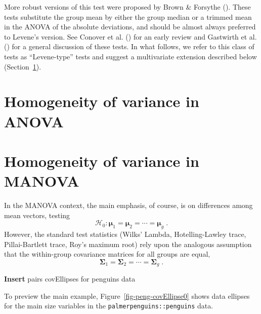 \documentclass[
  letterpaper,
  10pt,
  krantz2]{krantz}
\begin{document}
More robust versions of this test were proposed by Brown \& Forsythe
(). These tests substitute the
group mean by either the group median or a trimmed mean in the ANOVA of
the absolute deviations, and should be almost always preferred to
Levene's version. See Conover et al.
() for an early review and
Gastwirth et al. () for a
general discussion of these tests. In what follows, we refer to this
class of tests as ``Levene-type'' tests and suggest a multivariate
extension described below (Section~\ref{sec-mlevene}).

\section{Homogeneity of variance in ANOVA}\label{sec-mlevene}

\section{Homogeneity of variance in
MANOVA}\label{sec-homogeneity-MANOVA}

In the MANOVA context, the main emphasis, of course, is on differences
among mean vectors, testing \[
\mathcal{H}_0 : \mathbf{\mu}_1 = \mathbf{\mu}_2 = \cdots = \mathbf{\mu}_g \; .
\] However, the standard test statistics (Wilks' Lambda,
Hotelling-Lawley trace, Pillai-Bartlett trace, Roy's maximum root) rely
upon the analogous assumption that the within-group covariance matrices
for all groups are equal, \[
\mathbf{\Sigma}_1 = \mathbf{\Sigma}_2 = \cdots = \mathbf{\Sigma}_g \; .
\]

\textbf{Insert} pairs covEllipses for penguins data

To preview the main example, Figure~\ref{fig-peng-covEllipse0} shows
data ellipses for the main size variables in the
\texttt{palmerpenguins::penguins} data.
\end{document}
